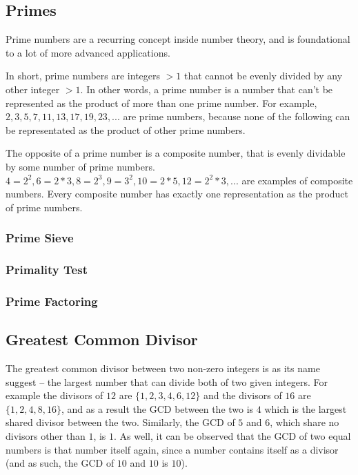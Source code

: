 \subsection{Primes}

Prime numbers are a recurring concept inside number theory, and is foundational to a lot of more advanced applications.

In short, prime numbers are integers $> 1$ that cannot be evenly divided by any other integer $> 1$. In other words, a prime number is a number that can't be represented as the product of more than one prime number. For example, $2, 3, 5, 7, 11, 13, 17, 19, 23, ...$ are prime numbers, because none of the following can be representated as the product of other prime numbers.

The opposite of a prime number is a composite number, that is evenly dividable by some number of prime numbers. $4 = 2^2, 6 = 2*3, 8 = 2^3, 9 = 3^2, 10 = 2*5, 12 = 2^2*3, ...$ are examples of composite numbers. Every composite number has exactly one representation as the product of prime numbers.

\subsubsection{Prime Sieve}

\subsubsection{Primality Test}

\subsubsection{Prime Factoring}

\subsection{Greatest Common Divisor}

The greatest common divisor between two non-zero integers is as its name suggest -- the largest number that can divide both of two given integers. For example the divisors of $12$ are $\{1,2,3,4,6,12\}$ and the divisors of $16$ are $\{1,2,4,8,16\}$, and as a result the GCD between the two is $4$ which is the largest shared divisor between the two. Similarly, the GCD of $5$ and $6$, which share no divisors other than $1$, is $1$. As well, it can be observed that the GCD of two equal numbers is that number itself again, since a number contains itself as a divisor (and as such, the GCD of $10$ and $10$ is $10$).

